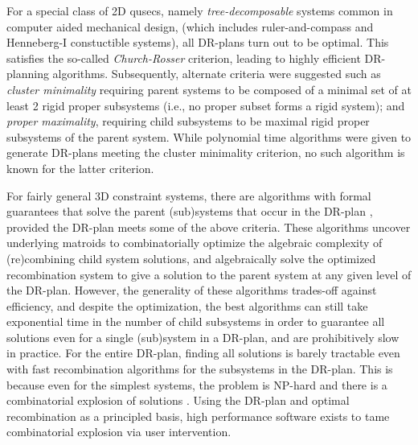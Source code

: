 \medskip\noindent{}
For a special class of 2D qusecs, namely  {\em tree-decomposable} systems \cite{XX} common in computer aided mechanical design, 
(which includes ruler-and-compass and Henneberg-I constuctible systems), all DR-plans turn out to 
be optimal. This satisfies the so-called {\em Church-Rosser} criterion, leading to highly efficient DR-planning algorithms.
Subsequently, alternate criteria were suggested   
such as {\em cluster minimality} 
requiring parent systems to be composed of  
a minimal set of at least 2 rigid proper subsystems (i.e., no proper subset forms a rigid system); 
and {\em proper maximality}, requiring child subsystems
to be maximal rigid proper subsystems of the parent system.
While polynomial time algorithms were given \cite{XX} to generate DR-plans meeting the cluster minimality criterion,
no such algorithm is known for the latter criterion.

 
\medskip\noindent{}
For fairly general 3D constraint systems, there are algorithms with formal guarantees that 
solve the parent (sub)systems that occur in the DR-plan \cite{XX, XX,XX}, 
provided the DR-plan meets some of the above criteria.
These algorithms  uncover underlying matroids to combinatorially optimize the algebraic complexity of (re)combining child system solutions, 
and algebraically solve the optimized recombination system to give a solution to the parent system at any
given level of the DR-plan. However, the generality of these algorithms trades-off against efficiency, and despite the optimization,
the best algorithms can still take
exponential time in the number of child subsystems in order to guarantee all solutions even for a single (sub)system in a DR-plan, 
and are prohibitively slow in practice. For the entire DR-plan, finding all solutions is barely tractable even with fast recombination algorithms
for the subsystems in the DR-plan. This is because even for the simplest systems, the problem is NP-hard \cite{XX} and there is a 
combinatorial explosion of solutions \cite{XX}.  Using the DR-plan and optimal recombination as a principled basis, high performance software exists \cite{XX,XX} to 
tame combinatorial explosion via user intervention.

